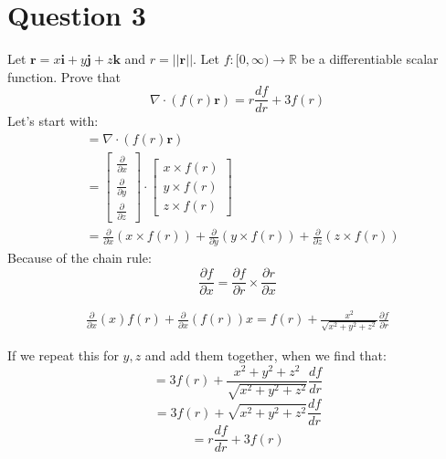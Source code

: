 \documentclass[12pt]{article}
\newcommand{\vect}[1]{\boldsymbol{#1}}
\begin{document}
\section*{Question 3}
Let $\vect{r}=x\vect{i}+y\vect{j}+z\vect{k}$ and $r=||\vect{r}||$. Let $f:[0,\infty )\rightarrow \mathbb{R} $ be a differentiable scalar function. Prove that\\
$$
\nabla \cdot (f(r)\vect{r})=r\frac{df}{dr}+3f(r)
$$
Let's start with:
\begin{align*}
&=\nabla \cdot (f(r)\vect{r})\\
&=\begin{bmatrix}
\frac{\partial}{\partial x} \\
\frac{\partial}{\partial y} \\
\frac{\partial}{\partial z}
\end{bmatrix}
\cdot 
\begin{bmatrix}
x\times f(r) \\
y\times f(r) \\
z\times f(r)
\end{bmatrix} \\
&= \frac{\partial}{\partial x}(x\times f(r)) + \frac{\partial}{\partial y}(y\times f(r)) + \frac{\partial}{\partial z}(z\times f(r)) 
\end{align*}
Because of the chain rule:
$$
\frac{\partial f}{\partial x}=\frac{\partial f}{\partial r}\times \frac{\partial r}{\partial x} 
$$

\begin{align*}
\frac{\partial}{\partial x}(x)f(r)+\frac{\partial}{\partial x}(f(r))x=f(r)+\frac{x^2}{\sqrt{x^2+y^2+z^2}}\frac{\partial f}{\partial r}
\end{align*}

If we repeat this for $y, z$ and add them together, when we find that: 
$$
=3f(r)+\frac{x^2+y^2+z^2}{\sqrt{x^2+y^2+z^2}}\frac{df}{dr}
$$
$$
=3f(r)+\sqrt{x^2+y^2+z^2}\frac{df}{dr}
$$
$$
=r\frac{df}{dr}+3f(r)
$$
\end{document}
